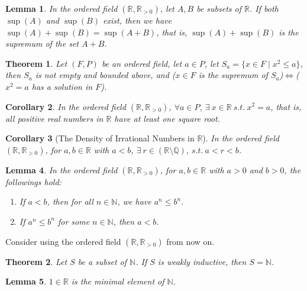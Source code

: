 \documentclass[11pt]{article}
\theoremstyle{break}
\theoremstyle{break}
\newtheorem{thm}{Theorem}[section]
\newtheorem{lem}{Lemma}[thm]
\newtheorem{corT}[lem]{Corollary}
\newcommand{\R}{\mathbb{R}}
\newcommand{\N}{\mathbb{N}}
\newcommand{\Q}{\mathbb{Q}}
\begin{document}
	\begin{lem}
		In the ordered field $(\R,\R_{>0})$, let $A,B$ be subsets of $\R$. If both $\sup(A)$ and $\sup(B)$ exist, then we have $\sup(A)+\sup(B)=\sup(A+B)$, that is, $\sup(A)+\sup(B)$ is the supremum of the set $A+B$.
	\end{lem}
	
	\begin{thm}
		Let $(F,P)$ be an ordered field, let $a \in P$, let $S_a = \{ x \in F \mid x^2 \leq a\}$, then $S_a$ is not empty and bounded above, and ($x \in F$ is the supremum of $S_a$)$\iff$($x^2 =a$ has a solution in $F$).
	\end{thm}
	
	\begin{corT}
		In the ordered field $(\R,\R_{>0})$, $ \forall a \in P$, $ \exists \ x \in \R \ s.t. \ x^2 = a$, that is, all positive real numbers in $\R$ have at least one square root.
	\end{corT}
	
	\begin{corT}[The Density of Irrational Numbers in $\R$]		
		In the ordered field $(\R,\R_{>0})$, for $a,b \in \R$ with $a<b$, $\exists \ r \in (\R \setminus \Q), \ s.t. \ a<r<b$.
	\end{corT}
	
	\begin{lem}
		In the ordered field $(\R,\R_{>0})$, for $a,b \in \R$ with $a>0$ and $b>0$, the followings hold:
		\begin{enumerate}[topsep=3pt,itemsep=-1ex,partopsep=1ex,parsep=1ex]
			\item If $a<b$, then for all $n \in \N$, we have $a^n \leq b^n$.
			\item If $a^n \leq b^n$ for some $n \in \N$, then $a<b$.
		\end{enumerate}
	\end{lem}
		
\clearpage


	
	\color{red} \noindent Consider using the ordered field $(\R,\R_{>0})$ from now on. \color{black}
	
	\begin{thm}
		Let $S$ be a subset of $\N$. If $S$ is weakly inductive, then $S=\N$.
	\end{thm}
	
	\begin{lem}
		$1 \in \R$ is the minimal element of $\N$.
	\end{lem}		
	
\end{document}
